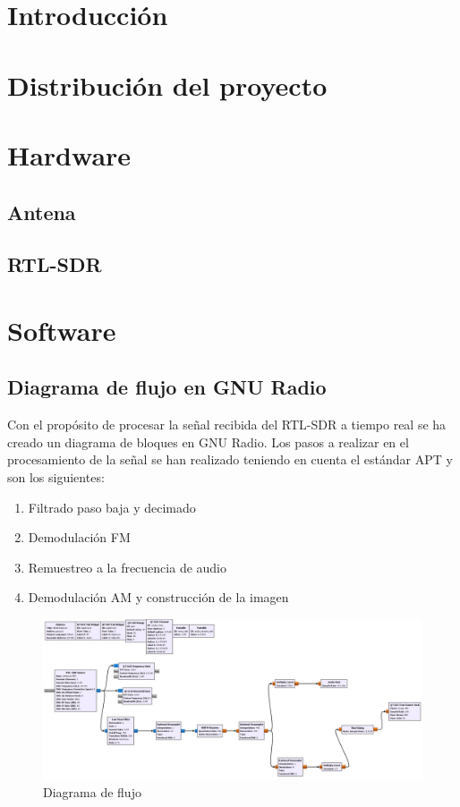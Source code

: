 \documentclass[a4paper,11pt]{article}
\begin{document}




\section{Introducción}

\section{Distribución del proyecto}


\section{Hardware}

	\subsection{Antena}
	\subsection{RTL-SDR}

\section{Software}

	\subsection{Diagrama de flujo en GNU Radio}
	Con el propósito de procesar la señal recibida del RTL-SDR a tiempo real se ha creado un diagrama de bloques en GNU Radio. Los pasos a realizar en el procesamiento de la señal se han realizado teniendo en cuenta el estándar APT y son los siguientes:
	\begin{enumerate}
	\item Filtrado paso baja y decimado
	\item Demodulación FM
	\item Remuestreo a la frecuencia de audio
	\item Demodulación AM y construcción de la imagen
	\end{enumerate}
	
	\begin{figure}[hbtp]
 \centering
 \includegraphics[width = 17cm]{imagenes/diagrama_flujo_completo.JPG}
 \caption{Diagrama de flujo}
 \label{diagrama_completo}
 \end{figure}	
	
\end{document}
